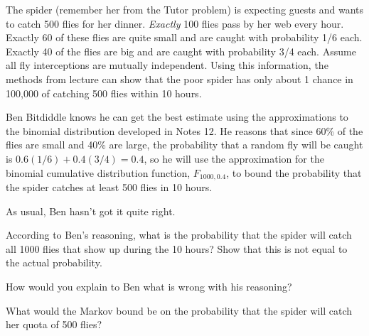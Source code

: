 \documentclass[10pt]{article}
\begin{document}
\begin{problem}
The spider (remember her from the Tutor problem) is expecting guests
and wants to catch 500 flies for her dinner.  \emph{Exactly} 100 flies
pass by her web every hour.  Exactly 60 of these flies are quite small
and are caught with probability 1/6 each.  Exactly 40 of the flies are
big and are caught with probability 3/4 each.  Assume all fly
interceptions are mutually independent.  Using this information, the
methods from lecture can show that the poor spider has only about 1
chance in 100,000 of catching 500 flies within 10 hours.

Ben Bitdiddle knows he can get the best estimate using the approximations
to the binomial distribution developed in Notes 12.  He reasons that since
60\% of the flies are small and 40\% are large, the probability that a
random fly will be caught is $0.6(1/6)+0.4(3/4) = 0.4$, so he will use the
approximation for the binomial cumulative distribution function,
$F_{1000,0.4}$, to bound the probability that the spider catches at least
500 flies in 10 hours.

As usual, Ben hasn't got it quite right.

\begin{problemparts}

\problempart According to Ben's reasoning, what is the probability that the
spider will catch all 1000 flies that show up during the 10 hours?  Show
that this is not equal to the actual probability.


\problempart How would you explain to Ben what is wrong with his reasoning?


\problempart What would the Markov bound be on the probability that the spider will
catch her quota of 500 flies?


\end{problemparts}
\end{problem}
\end{document}
